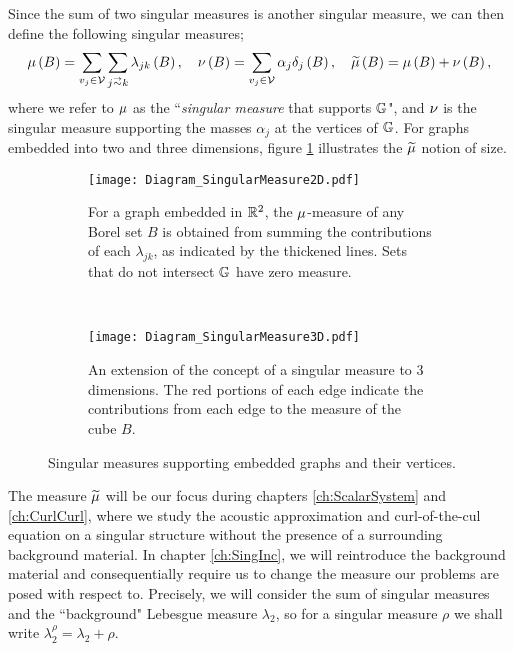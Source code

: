 Since the sum of two singular measures is another singular measure, we can then define the following singular measures;
\begin{align} \label{eq:Intro-MeasureDefs}
	\ddmes\bracs{B} = \sum_{v_j\in \vertSet}\sum_{j\conLeft k} \lambda_{jk}\bracs{B},
	\quad
	\massMes\bracs{B} = \sum_{v_j\in\vertSet}\alpha_j\delta_j\bracs{B},
	\quad
	\dddmes\bracs{B} = \ddmes\bracs{B} + \massMes\bracs{B},
\end{align}
where we refer to $\mu$ as the ``\emph{singular measure} that supports $\mathbb{G}$", and $\nu$ is the singular measure supporting the masses $\alpha_j$ at the vertices of $\mathbb{G}$.
For graphs embedded into two and three dimensions, figure \ref{fig:Diagram_SingularMeasure2D} illustrates the $\widetilde{\mu}$ notion of size.
\begin{figure}[t!]
	\centering
	\begin{subfigure}[t]{0.45\textwidth}
		\centering
		\texttt{[image: Diagram\_SingularMeasure2D.pdf]}
		\caption[]{\label{fig:Diagram_SingularMeasure2D} For a graph embedded in $\mathbb{R}^2$, the $\mu$-measure of any Borel set $B$ is obtained from summing the contributions of each $\lambda_{jk}$, as indicated by the thickened lines. Sets that do not intersect $\mathbb{G}$ have zero measure.}
	\end{subfigure}
	~
	\begin{subfigure}[t]{0.45\textwidth}
		\centering
		\texttt{[image: Diagram\_SingularMeasure3D.pdf]}
		\caption[]{\label{fig:Diagram_SingularMeasure3D} An extension of the concept of a singular measure to 3 dimensions. The red portions of each edge indicate the contributions from each edge to the measure of the cube $B$.}
	\end{subfigure}
	\caption[Singular measures supporting embedded graphs.]{\label{fig:Diagram_SingularMeasure} Singular measures supporting embedded graphs and their vertices.}
\end{figure}

The measure $\widetilde{\mu}$ will be our focus during chapters \ref{ch:ScalarSystem} and \ref{ch:CurlCurl}, where we study the acoustic approximation and curl-of-the-cul equation on a singular structure without the presence of a surrounding background material.
In chapter \ref{ch:SingInc}, we will reintroduce the background material and consequentially require us to change the measure our problems are posed with respect to.
Precisely, we will consider the sum of singular measures and the ``background" Lebesgue measure $\lambda_2$, so for a singular measure $\rho$ we shall write $\lambda_2^{\rho} = \lambda_2 + \rho$.